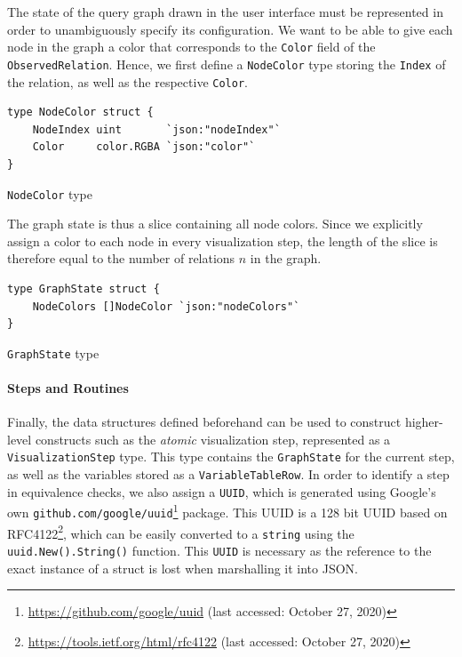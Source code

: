 The state of the query graph drawn in the user interface must be represented in order to unambiguously specify its configuration. We want to be able to give each node in the graph a color that corresponds to the \texttt{Color} field of the \texttt{ObservedRelation}. Hence, we first define a \texttt{NodeColor} type storing the \texttt{Index} of the relation, as well as the respective \texttt{Color}.

\begin{code}
\begin{verbatim}
type NodeColor struct {
    NodeIndex uint       `json:"nodeIndex"`
    Color     color.RGBA `json:"color"`
}
\end{verbatim}
\caption{\texttt{NodeColor} type}
\end{code}
\vspace{0.8cm}

The graph state is thus a slice containing all node colors. Since we explicitly assign a color to each node in every visualization step, the length of the slice is therefore equal to the number of relations $n$ in the graph.

\begin{code}
\begin{verbatim}
type GraphState struct {
    NodeColors []NodeColor `json:"nodeColors"`
}
\end{verbatim}
\caption{\texttt{GraphState} type}
\end{code}
\vspace{0.8cm}

\paragraph{Steps and Routines}

Finally, the data structures defined beforehand can be used to construct higher-level constructs such as the \textit{atomic} visualization step, represented as a \texttt{VisualizationStep} type. This type contains the \texttt{GraphState} for the current step, as well as the variables stored as a \texttt{VariableTableRow}. In order to identify a step in equivalence checks, we also assign a \texttt{UUID}, which is generated using Google's own \texttt{github.com/google/uuid}\footnote{\url{https://github.com/google/uuid} (last accessed: October 27, 2020)} package. This UUID is a 128 bit UUID based on RFC4122\footnote{\url{https://tools.ietf.org/html/rfc4122} (last accessed: October 27, 2020)}, which can be easily converted to a \texttt{string} using the \texttt{uuid.New().String()} function. This \texttt{UUID} is necessary as the reference to the exact instance of a struct is lost when marshalling it into JSON.

